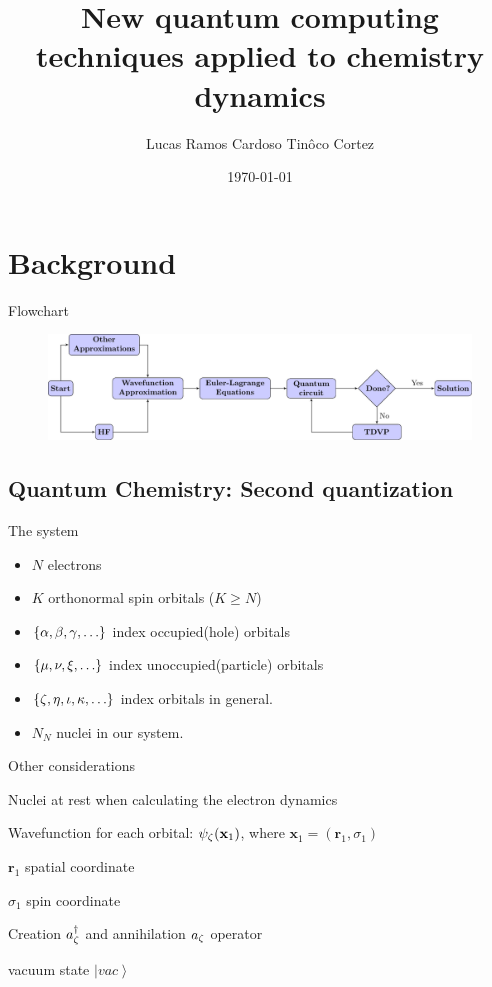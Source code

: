 \documentclass[professionalfonts]{beamer}
\title[Dissertation defence]{New quantum computing techniques applied to chemistry dynamics}
\author{Lucas Ramos Cardoso Tin\^{o}co Cortez}
\institute{Texas Tech University}
\date{\today}
\newcommand{\bx}{\bm{x}}
\newcommand{\br}{\bm{r}}
\newcommand{\ket}[1]{\ensuremath{\left|#1\right\rangle}}
\newcommand{\paren}[1]{\left( #1 \right)}
\newcommand{\elec}{N}
\newcommand{\nuc}{N_{N}}
\newcommand{\orb}{K}
\newcommand{\anig}[1]{a_{\go{#1}}}
\newcommand{\creg}[1]{a^\dagger_{\go{#1}}}
\newcommand{\vac}{\ket{vac}}
\newcommand{\uo}[1]{
		\IfEqCase{#1}{
			{0}{\mu}
			{1}{\nu}
			{2}{\xi}
		}[\PackageError{uo}{Undefined option to uo: #1}{}]
}
\newcommand{\oo}[1]{
		\IfEqCase{#1}{
			{0}{\alpha}
			{1}{\beta}
			{2}{\gamma}
		}[\PackageError{unocorb}{Undefined option to unuo: #1}{}]
}
\newcommand{\go}[1]{
		\IfEqCase{#1}{
			{0}{\zeta}
			{1}{\eta}
			{2}{\iota}
			{3}{\kappa}
		}[\PackageError{unocorb}{Undefined option to go: #1}{}]
}
\newcommand{\psig}[1]{
	\psi_{\go{#1}}
}
\newcommand{\SubItem}[1]{
    {\setlength\itemindent{15pt} \item[*] #1}
}
\begin{document}
\begin{frame}
	\titlepage
\end{frame}

\begin{frame}
\tableofcontents	%
\end{frame}

\section{\textbf{Background}}

\begin{frame}{Flowchart}
\begin{figure}[b]
	\centering
	\includegraphics[width=\textwidth]{../flowcharts/flowchart2}
\end{figure}
\end{frame}

\subsection{\textbf{Quantum Chemistry: Second quantization}}

\begin{frame}{The system}
	\begin{itemize}
		\item $\elec$ electrons
		\item $\orb$ orthonormal spin orbitals ($\orb \geq \elec$)
		\item $\{\oo{0}, \oo{1}, \oo{2}, \ldots\}$ index occupied(hole) orbitals
		\item $\{\uo{0},\uo{1},\uo{2}, \ldots\}$ index unoccupied(particle) orbitals
		\item $\{\go{0}, \go{1}, \go{2}, \go{3}, \ldots\}$ index orbitals in general.
		\item $\nuc$ nuclei in our system.
	\end{itemize}
\end{frame}

\begin{frame}{Other considerations}
	\begin{itemize}
		\item Nuclei at rest when calculating the electron dynamics
		\item Wavefunction for each orbital: $\psig 0(\mathbf{x}_1)$, where $\bx_1 = \paren{\br_1, \sigma_1}$
			\SubItem {$\br_1$ spatial coordinate}
			\SubItem {$\sigma_1$ spin coordinate}
		\item Creation $\creg{0}$ and annihilation $\anig{0}$ operator
		\item vacuum state $\vac$
	\end{itemize}
\end{frame}
\end{document}
